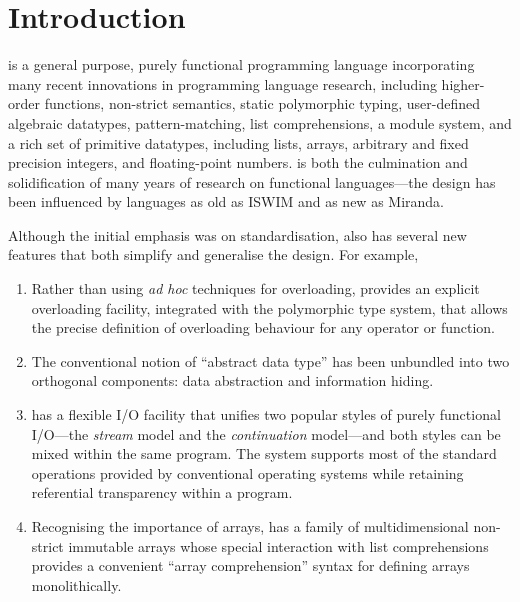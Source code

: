 %
%
\section{Introduction}
\label{introduction}

\Haskell{} is a general purpose, purely functional
programming language incorporating many recent innovations in
programming language research,
including higher-order functions,
non-strict semantics, static polymorphic typing, user-defined
algebraic datatypes, pattern-matching, list comprehensions, a module
system, and a rich set of primitive datatypes, including lists,
arrays, arbitrary and fixed precision integers, and floating-point
numbers.  \Haskell{} is both the culmination
and solidification of many years of research on functional
languages---the design has been influenced by languages as old as
ISWIM and as new as Miranda.

Although the initial emphasis was on standardisation, \Haskell{}
also has several new features that both simplify and
generalise the design.  For example,
\begin{enumerate}
\item Rather than using {\em ad hoc} techniques for
overloading,
\Haskell{} provides an explicit overloading facility, integrated with
the polymorphic type system, that allows the
precise definition of overloading behaviour for any operator or function.


\item The conventional notion of ``abstract data
type''
has been unbundled
into two orthogonal components:
data abstraction
and information hiding.

\item \Haskell{} has a flexible I/O facility that unifies two
popular styles of purely functional I/O---the {\em stream} model and
the {\em continuation} model---and both styles can be mixed within the same
program.  The system supports most of the standard operations provided by
conventional operating systems while retaining referential
transparency within a program.

\item Recognising the importance of arrays, \Haskell{} has a
family of multidimensional non-strict immutable arrays
whose special interaction with list comprehensions provides a
convenient ``array comprehension'' syntax for defining arrays
monolithically.
\end{enumerate}

